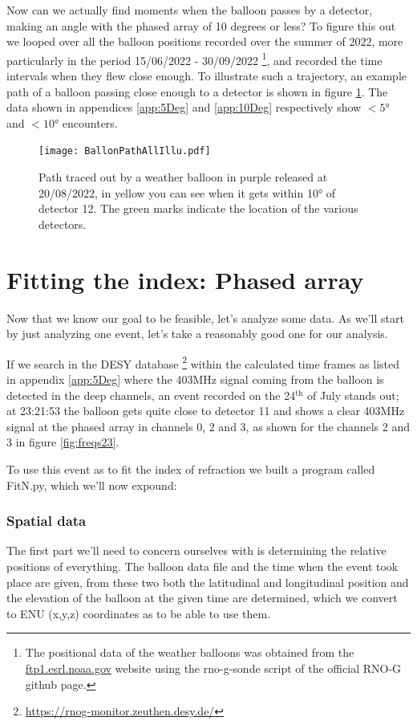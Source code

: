 Now can we actually find moments when the balloon passes by a detector, making
an angle with the phased array of 10 degrees or less?  To figure this out we
looped over all the balloon positions recorded over the summer of 2022, more
particularly in the period 15/06/2022 - 30/09/2022 \footnote{The positional
data of the weather balloons was obtained from the \url{ftp1.esrl.noaa.gov}
website using the rno-g-sonde script of the official RNO-G github page.}, and
recorded the time intervals when they flew close enough.  To illustrate such a
trajectory, an example path of a balloon passing close enough to a detector is
shown in figure \ref{fig:ExampleBalloonPathCrossing12}.  The data shown in
appendices \ref{app:5Deg} and \ref{app:10Deg} respectively show $<5$° and
$<10$° encounters.
\newpage
\begin{figure}
  \centering
	\texttt{[image: BallonPathAllIllu.pdf]}
  \caption{Path traced out by a weather balloon in purple released at 20/08/2022, in yellow you can see when it
  gets within 10° of detector 12. The green marks indicate the location of the various detectors.}
  \label{fig:ExampleBalloonPathCrossing12}
\end{figure}
\section{Fitting the index: Phased array}
Now that we know our goal to be feasible, let's analyze some data.  As we'll
start by just analyzing one event, let's take a reasonably good one for our analysis.

If we search in the DESY database
\footnote{\url{https://rnog-monitor.zeuthen.desy.de/}} within the calculated
time frames as listed in appendix \ref{app:5Deg} where the 403MHz signal coming from the
balloon is detected in the deep channels, an event recorded on the 24$^\text{th}$ of July stands
out; at 23:21:53 the balloon gets quite close to detector 11 and shows a clear
403MHz signal at the phased array in channels 0, 2 and 3, as shown for the
channels 2 and 3 in figure \ref{fig:freqs23}.

To use this event as to fit the index of refraction we built a program called FitN.py\cite{projects-mt}, 
which we'll now expound:
\subsubsection{Spatial data}
The first part we'll need to concern ourselves with is determining the relative
positions of everything. The balloon data file and the time when the event took
place are given, from these two both the latitudinal and longitudinal position
and the elevation of the balloon at the given time are determined, which we convert
to ENU (x,y,z) coordinates as to be able to use them. 

